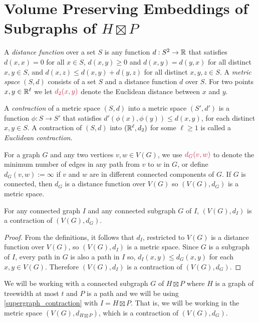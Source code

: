 \documentclass{patmorin}
\makeatletter
\newcommand{\defin}[1]{\emph{\textcolor{brightmaroon}{#1}}}
\def\mathcolor#1#{\@mathcolor{#1}}
\def\@mathcolor#1#2#3{%
  \protect\leavevmode
  \begingroup
    \color#1{#2}#3%
  \endgroup
}
\newcommand{\mathdefin}[1]{\mathcolor{brightmaroon}{#1}}
\makeatother
\begin{document}
\section{\boldmath Volume Preserving Embeddings of Subgraphs of $H\boxtimes P$}


A \defin{distance function} over a set $S$ is any function $d:S^2\to\mathbb{R}$ that satisfies $d(x,x)=0$ for all $x\in S$, $d(x,y)\ge 0$ and $d(x,y)=d(y,x)$ for all distinct $x,y\in S$, and $d(x,z) \le d(x,y)+d(y,z)$ for all distinct $x,y,z\in S$.  A \defin{metric space} $(S,d)$ consists of a set $S$ and a distance function $d$ over $S$.  For two points $x,y\in\mathbb{R}^\ell$ we let $\mathdefin{d_2(x,y)}$ denote the Euclidean distance between $x$ and $y$.

A \defin{contraction} of a metric space $(S,d)$ into a metric space $(S',d')$ is a function $\phi:S\to S'$ that satisfies $d'(\phi(x),\phi(y))\le d(x,y)$, for each distinct $x,y\in S$.  A contraction of $(S,d)$ into $(\mathbb{R}^\ell, d_2)$ for some $\ell\ge 1$ is called a \defin{Euclidean contraction}.

For a graph $G$ and any two vertices $v,w\in V(G)$, we use $\mathdefin{d_G(v,w)}$ to denote the minimum number of edges in any path from $v$ to $w$ in $G$, or define $d_G(v,w):=\infty$ if $v$ and $w$ are in different connected components of $G$.  If $G$ is connected, then $d_G$ is a distance function over $V(G)$ so $(V(G),d_G)$ is a metric space.

\begin{obs}\label{supergraph_contraction}
  For any connected graph $I$ and any connected subgraph $G$ of $I$, $(V(G),d_I)$ is a contraction of $(V(G),d_G)$.
\end{obs}

\begin{proof}
  From the definitions, it follows that $d_I$, restricted to $V(G)$ is a distance function over $V(G)$, so $(V(G),d_I)$ is a metric space.  Since $G$ is a subgraph of $I$, every path in $G$ is also a path in $I$ so, $d_I(x,y)\le d_G(x,y)$ for each $x,y\in V(G)$.  Therefore $(V(G),d_I)$ is a contraction of $(V(G),d_G)$.
\end{proof}

We will be working with a connected subgraph $G$ of $H\boxtimes P$ where $H$ is a graph of treewidth at most $t$ and $P$ is a path and we will be using \cref{supergraph_contraction} with $I=H\boxtimes P$.  That is, we will be working in the metric space $(V(G),d_{H\boxtimes P})$, which is a contraction of $(V(G),d_G)$.
\end{document}
